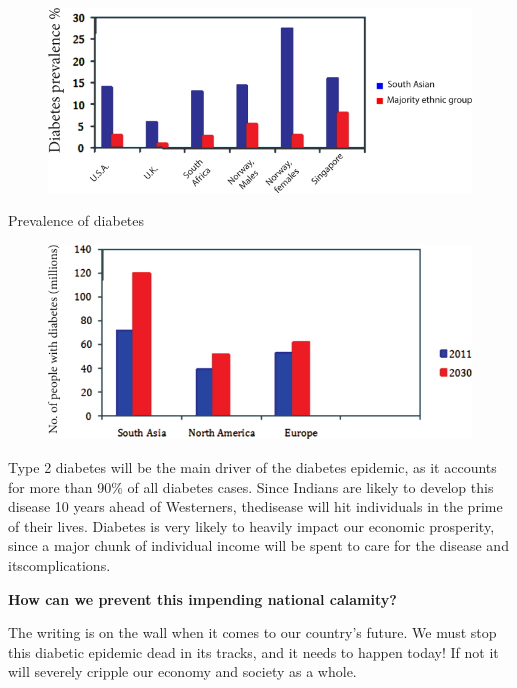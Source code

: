 \begin{figure}[h]
\centering
\includegraphics[scale=2.1]{images/032.jpg}
\end{figure}

\clearpage
\begin{center}
Prevalence of diabetes
\end{center}


\begin{figure}[h]
\centering
\includegraphics[scale=2.5]{images/033.jpg}
\end{figure}

Type 2 diabetes will be the main driver of the diabetes epidemic, as it accounts for more than 90\% of all diabetes cases. Since Indians are likely to develop this disease 10 years ahead of Westerners, the\break disease will hit individuals in the prime of their lives. Diabetes is very likely to heavily impact our economic prosperity, since a major chunk of individual income will be spent to care for the disease and its\break complications.

\vskip 8pt
\noindent\textbf{How can we prevent this impending national calamity?}

\vskip 8pt
The writing is on the wall when it comes to our country’s future. We must stop this diabetic epidemic dead in its tracks, and it needs to happen today! If not it will severely cripple our economy and society as a whole.

